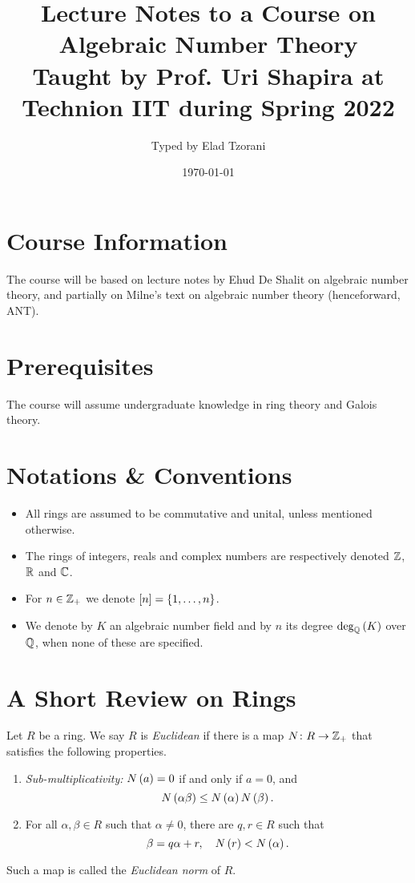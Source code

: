 \documentclass[11pt]{article}
\title{Lecture Notes to a Course on Algebraic Number Theory \\ \small{Taught by Prof. Uri Shapira at Technion IIT during Spring 2022}}
\author{Typed by Elad Tzorani}
\date{\today}
\begin{document}
\maketitle


\section*{Course Information}

The course will be based on lecture notes by Ehud De Shalit on algebraic number theory, and partially on Milne's text on algebraic number theory (henceforward, ANT).

\section*{Prerequisites}

The course will assume undergraduate knowledge in ring theory and Galois theory.

\section{Notations \& Conventions}


\begin{itemize}
\item All rings are assumed to be commutative and unital, unless mentioned otherwise. 
\item The rings of integers, reals and complex numbers are respectively denoted $\mathbb{Z}$, $\mathbb{R}$ and $\mathbb{C}$.
\item For $n \in \mathbb{Z}_+$ we denote $\brs{n} = \set{1, \ldots, n}$.
\item We denote by $K$ an algebraic number field and by $n$ its degree $\deg_{\mathbb{Q}}\left( K \right)$ over $\mathbb{Q}$, when none of these are specified.
\end{itemize}

\section{A Short Review on Rings}

\begin{definition}
Let $R$ be a ring. We say $R$ is \emph{Euclidean} if there is a map $N \colon R \to \mathbb{Z}_+$ that satisfies the following properties.

\begin{enumerate}[label = (\roman*)]
\item \emph{Sub-multiplicativity:} $N\left( a \right) = 0$ if and only if $a=0$, and
\[N\left( \alpha \beta \right) \leq N\left( \alpha \right) N\left( \beta \right) \text{.}\]
\item For all $\alpha,\beta \in R$ such that $\alpha \neq 0$, there are $q,r \in R$ such that
\[\beta = q \alpha + r, \quad N\left( r \right) < N\left( \alpha \right) \text{.}\]
\end{enumerate}

Such a map is called the \emph{Euclidean norm} of $R$.
\end{definition}
\end{document}
